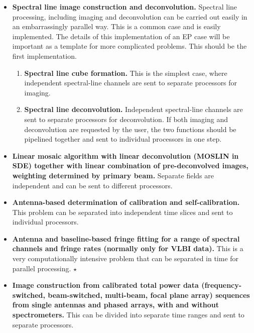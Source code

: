 \begin{itemize}

\item {\bf Spectral line image construction and deconvolution.}
Spectral line processing, including imaging and deconvolution can be
carried out easily in an embarrassingly parallel way.  This is a
common case and is easily implemented.  The details of this
implementation of an EP case will be important as a template for more
complicated problems.  This should be the first implementation.

\begin{enumerate}

\item {\bf Spectral line cube formation.}  This is the simplest case,
where independent spectral-line channels are sent to separate
processors for imaging.

\item {\bf Spectral line deconvolution.}  Independent spectral-line
channels are sent to separate processors for deconvolution.  If both
imaging and deconvolution are requested by the user, the two functions
should be pipelined together and sent to individual processors in one
step.

\end{enumerate}

\item {\bf Linear mosaic algorithm with linear deconvolution (MOSLIN
in SDE) together with linear combination of pre-deconvolved images,
weighting determined by primary beam.}  Separate fields are
independent and can be sent to different processors.

\item {\bf Antenna-based determination of calibration and
self-calibration.}  This problem can be separated into independent
time slices and sent to individual processors.

\item {\bf Antenna and baseline-based fringe fitting for a range of
spectral channels and fringe rates (normally only for VLBI data).}
This is a very computationally intensive problem that can be separated
in time for parallel processing. $\star$

\item {\bf Image construction from calibrated total power data
(frequency-switched, beam-switched, multi-beam, focal plane array)
sequences from single antennas and phased arrays, with and without
spectrometers.}  This can be divided into separate time ranges and
sent to separate processors.


\end{itemize}
